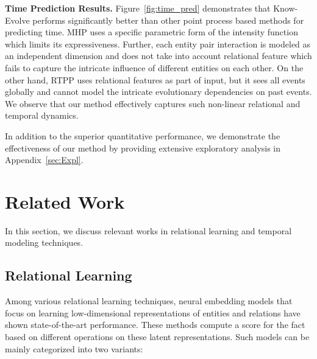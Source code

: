 \documentclass{article}
\begin{document}
{\bf Time Prediction Results.} Figure~\ref{fig:time_pred} demonstrates that Know-Evolve performs significantly better than other point process based methods for predicting time. MHP uses a specific parametric form of the intensity function which limits its expressiveness. Further, each entity pair interaction is modeled as an independent dimension and does not take into account relational feature which fails to capture the intricate influence of different entities on each other. On the other hand, RTPP uses  relational features as part of input, but it sees all events globally and cannot model the intricate evolutionary dependencies on past events. We observe that our method effectively captures such non-linear relational and temporal dynamics. 

In addition to the superior quantitative performance, we demonstrate the effectiveness of our method by providing extensive exploratory analysis  in Appendix~\ref{sec:Expl}.
\vspace{-0.3cm}

\section{Related Work}
\vspace{-0.1cm}
In this section, we discuss relevant works in relational learning and temporal modeling techniques.
\vspace{-0.2cm}
\subsection{Relational Learning}
Among various relational learning techniques, neural embedding models that focus on learning low-dimensional representations of entities and relations have shown state-of-the-art performance. These methods compute a score for the fact based on different operations on these latent representations. Such models can be mainly categorized into two variants: 
\end{document}
